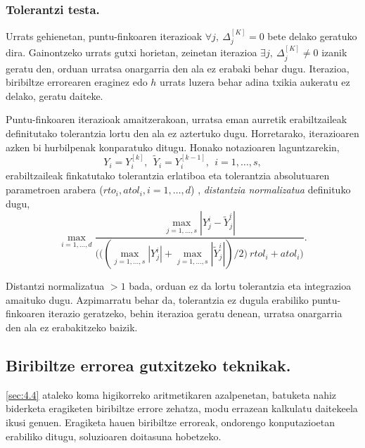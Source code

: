 \subsubsection*{Tolerantzi testa.}

Urrats gehienetan, puntu-finkoaren iterazioak $\forall j, \ \Delta_{j}^{[K]}=0$ bete delako geratuko dira. Gainontzeko urrats gutxi horietan, zeinetan iterazioa $\exists j,  \ \Delta_{j}^{[K]} \neq 0$ izanik geratu den, orduan  urratsa onargarria den ala ez erabaki behar dugu. Iterazioa, biribiltze errorearen eraginez edo $h$ urrats luzera  behar adina txikia aukeratu ez delako, geratu daiteke.

Puntu-finkoaren iterazioak amaitzerakoan, urratsa eman aurretik erabiltzaileak definitutako tolerantzia lortu den ala ez aztertuko dugu. Horretarako, iterazioaren azken bi hurbilpenak konparatuko ditugu. Honako notazioaren laguntzarekin,
\begin{equation*}
Y_i=Y_i^{[k]}, \ \ \tilde{Y}_i=Y_i^{[k-1]}, \ \ i=1,\dots,s,
\end{equation*}  
erabiltzaileak finkatutako tolerantzia erlatiboa eta tolerantzia absolutuaren parametroen arabera ($rto_i,atol_i, i=1,\dots,d$) , \emph{distantzia normalizatua} definituko dugu,
\begin{equation*}
\max_{i=1,\dots,d} \frac{\max_{j=1,\dots,s} |Y_j^i-\tilde{Y}_j^i|}
                        {\bigg(\big((\max_{j=1,\dots,s} |Y_j^i|+\max_{j=1,\dots,s} |\tilde{Y}_j^i|)/2 \big) \ rtol_i+ atol_i \bigg)}.
\end{equation*}

Distantzi normalizatua $>1$ bada, orduan ez da lortu tolerantzia eta integrazioa amaituko dugu.
Azpimarratu behar da, tolerantzia ez dugula erabiliko puntu-finkoaren iterazio geratzeko, behin iterazioa geratu denean, urratsa onargarria den ala ez erabakitzeko baizik.

\subsection{Biribiltze errorea gutxitzeko teknikak.}

\ref{sec:4.4} ataleko koma higikorreko aritmetikaren azalpenetan, batuketa nahiz biderketa eragiketen biribiltze errore zehatza, modu errazean kalkulatu daitekeela ikusi genuen. Eragiketa hauen biribiltze erroreak, ondorengo konputazioetan erabiliko ditugu, soluzioaren doitasuna hobetzeko.


